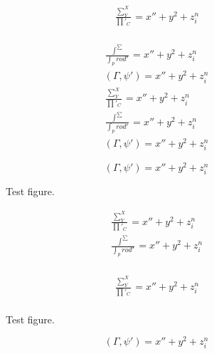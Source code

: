 \documentclass[twocolumn]{article}
\newcommand{\ip}[2]{(#1, #2)}
\begin{document}
\lipsum[10]
\begin{gridenv}
\begin{eqnarray}
\frac{\sum^X_Y}{\prod'_C} = x'' + y^{2} + z_{i}^{n}\label{eq2}\\
\end{eqnarray}
\end{gridenv}
\lipsum[11]
\begin{gridenv}
\begin{eqnarray}
\frac{\int^\sum}{\int_prod'} = x'' + y^{2} + z_{i}^{n}\label{eq3}\\
\ip{\Gamma}{\psi'} = x'' + y^{2} + z_{i}^{n}\label{eq4}\\
\frac{\sum^X_Y}{\prod'_C} = x'' + y^{2} + z_{i}^{n}\label{eq2}\\
\frac{\int^\sum}{\int_prod'} = x'' + y^{2} + z_{i}^{n}\label{eq3}\\
\ip{\Gamma}{\psi'} = x'' + y^{2} + z_{i}^{n}\label{eq4}
\end{eqnarray}
\end{gridenv}
\lipsum[3]
\begin{gridenv}
\begin{equation}
\ip{\Gamma}{\psi'} = x'' + y^{2} + z_{i}^{n}\label{eq1}
\end{equation}
\end{gridenv}

\begin{figure*}
\vbox{\centering{}}
\caption{Test figure.}
\end{figure*}
\lipsum[8]
\begin{gridenv}
\begin{eqnarray}
\frac{\sum^X_Y}{\prod'_C} = x'' + y^{2} + z_{i}^{n}\label{eq2}\\
\frac{\int^\sum}{\int_prod'} = x'' + y^{2} + z_{i}^{n}\label{eq3}\\
\end{eqnarray}
\end{gridenv}
\lipsum[7]
\begin{gridenv}
\begin{eqnarray}
\frac{\sum^X_Y}{\prod'_C} = x'' + y^{2} + z_{i}^{n}\label{eq2}\\
\end{eqnarray}
\end{gridenv}
\begin{figure}
\vbox{\centering{}}
\caption{Test figure.}
\end{figure}
\lipsum[3]
\begin{gridenv}
\begin{equation}
\ip{\Gamma}{\psi'} = x'' + y^{2} + z_{i}^{n}\label{eq1}
\end{equation}
\end{gridenv}
\lipsum[1-3]
\end{document}
